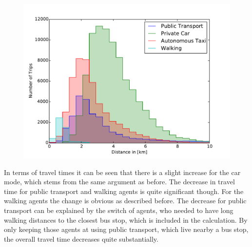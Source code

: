 \begin{figure}
    \centering
    \includegraphics[width=1.0\textwidth]{figures/modehist_av.pdf}
    \caption{}
    \label{fig:modehist_av}
\end{figure}

In terms of travel times it can be seen that there is a slight increase for the car
mode, which stems from the same argument as before. The decrease in travel time for
public transport and walking agents is quite significant though. For the walking
agents the change is obvious as described before. The decrease for public transport
can be explained by the switch of agents, who needed to have long walking distances
to the closest bus stop, which is included in the calculation. By only keeping those
agents at using public transport, which live nearby a bus stop, the overall travel
time decreases quite substantially.


